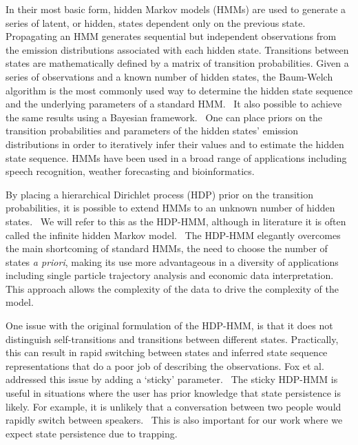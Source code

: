 \documentclass[journal=jpcbfk,manuscript=article]{achemso}
\begin{document}
  In their most basic form, hidden Markov models (HMMs) are used to generate
  a series of latent, or hidden, states dependent only on the previous state.~\cite{rabiner_tutorial_1989}
  Propagating an HMM generates sequential but independent observations from 
  the emission distributions associated with each hidden state. Transitions 
  between states are mathematically defined by a matrix of transition probabilities.
  Given a series of observations and a known number of hidden states, the 
  Baum-Welch algorithm is the most commonly used way to determine the hidden
  state sequence and the underlying parameters of a standard HMM.~\cite{baum_maximization_1970}
  It also possible to achieve the same results using a Bayesian 
  framework.~\cite{scott_bayesian_2002,jasra_markov_2005} One can place priors
  on the transition probabilities and parameters of the hidden states' emission
  distributions in order to iteratively infer their values and to estimate the hidden state
  sequence. HMMs have been used in a broad range of applications including speech
  recognition, weather forecasting and bioinformatics.~\cite{juang_hidden_1984,hughes_non-homogeneous_1999,yoon_hidden_2009}
  
  By placing a hierarchical Dirichlet process (HDP) prior on the transition 
  probabilities, it is possible to extend HMMs to an unknown number of hidden
  states.~\cite{teh_hierarchical_2006} We will refer to this as the HDP-HMM,
  although in literature it is often called the infinite hidden Markov 
  model.~\cite{beal_infinite_2002} The HDP-HMM elegantly overcomes the main
  shortcoming of standard HMMs, the need to choose the number of states 
  \textit{a priori}, making its use more advantageous in a diversity of 
  applications including single particle trajectory analysis and economic 
  data interpretation.~\cite{hines_analyzing_2015,shi_identifying_2016} 
  This approach allows the complexity of the data to drive the complexity
  of the model.
  
  One issue with the original formulation of the HDP-HMM, is that it does 
  not distinguish self-transitions and transitions between different states.
  Practically, this can result in rapid switching between states and inferred
  state sequence representations that do a poor job of describing the 
  observations. Fox et al. addressed this issue by adding a `sticky' 
  parameter.~\cite{fox_sticky_2007} The sticky HDP-HMM is useful in situations
  where the user has prior knowledge that state persistence is likely.
  For example, it is unlikely that a conversation between two people would 
  rapidly switch between speakers.~\cite{fox_sticky_2011} This is also 
  important for our work where we expect state persistence due to trapping.   
  
\end{document}
